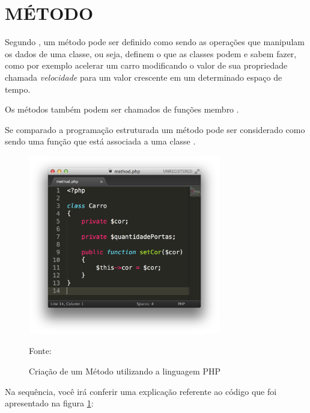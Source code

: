 \section{MÉTODO}

Segundo , um
método pode ser definido como sendo as operações que manipulam os dados de uma 
classe, ou seja, definem o que as classes podem e sabem fazer, como por exemplo 
acelerar um carro modificando o valor de sua propriedade chamada 
\textit{velocidade} para um valor crescente em um determinado espaço de tempo.

Os métodos também podem ser chamados de funções membro \cite{c++ComoProgramar}.

Se comparado a programação estruturada um método pode ser considerado como sendo
uma função que está associada a uma classe \cite{programmingPhp}.

\begin{figure}[h!tb]
	\label{fig:metodo}
	
	\centering
	\caption{Criação de um Método utilizando a linguagem PHP}
	
	\centering
	\includegraphics[width=0.75\textwidth]{images/method.png}
	
	\centering
	\footnotesize Fonte: \fonteOAutor
\end{figure}

\FloatBarrier 	%

Na sequência, você irá conferir uma explicação referente ao código que foi
apresentado na figura \ref{fig:metodo}:

